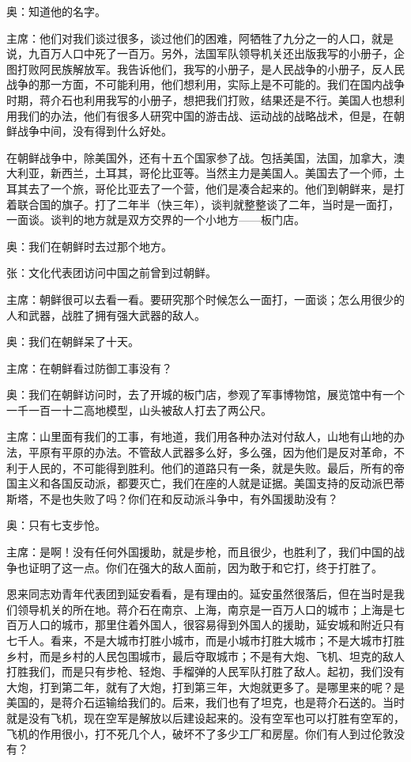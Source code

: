 奥：知道他的名字。

主席：他们对我们谈过很多，谈过他们的困难，阿牺牲了九分之一的人口，就是说，九百万人口中死了一百万。另外，法国军队领导机关还出版我写的小册子，企图打败阿民族解放军。我告诉他们，我写的小册子，是人民战争的小册子，反人民战争的那一方面，不可能利用，他们想利用，实际上是不可能的。我们在国内战争时期，蒋介石也利用我写的小册子，想把我们打败，结果还是不行。美国人也想利用我们的办法，他们有很多人研究中国的游击战、运动战的战略战术，但是，在朝鲜战争中间，没有得到什么好处。

在朝鲜战争中，除美国外，还有十五个国家参了战。包括美国，法国，加拿大，澳大利亚，新西兰，土耳其，哥伦比亚等。当然主力是美国人。美国去了一个师，土耳其去了一个旅，哥伦比亚去了一个营，他们是凑合起来的。他们到朝鲜来，是打着联合国的旗子。打了二年半（快三年），谈判就整整谈了二年，当时是一面打，一面谈。谈判的地方就是双方交界的一个小地方——板门店。

奥：我们在朝鲜时去过那个地方。

张：文化代表团访问中国之前曾到过朝鲜。

主席：朝鲜很可以去看一看。要研究那个时候怎么一面打，一面谈；怎么用很少的人和武器，战胜了拥有强大武器的敌人。

奥：我们在朝鲜呆了十天。

主席：在朝鲜看过防御工事没有？

奥：我们在朝鲜访问时，去了开城的板门店，参观了军事博物馆，展览馆中有一个一千一百一十二高地模型，山头被敌人打去了两公尺。

主席：山里面有我们的工事，有地道，我们用各种办法对付敌人，山地有山地的办法，平原有平原的办法。不管敌人武器多么好，多么强，因为他们是反对革命，不利于人民的，不可能得到胜利。他们的道路只有一条，就是失败。最后，所有的帝国主义和各国反动派，都要灭亡，我们在座的人就是证据。美国支持的反动派巴蒂斯塔，不是也失败了吗？你们在和反动派斗争中，有外国援助没有？

奥：只有七支步怆。

主席：是啊！没有任何外国援助，就是步枪，而且很少，也胜利了，我们中国的战争也证明了这一点。你们在强大的敌人面前，因为敢于和它打，终于打胜了。

恩来同志劝青年代表团到延安看看，是有理由的。延安虽然很落后，但在当时是我们领导机关的所在地。蒋介石在南京、上海，南京是一百万人口的城市；上海是七百万人口的城市，那里住着外国人，很容易得到外国人的援助，延安城和附近只有七千人。看来，不是大城市打胜小城市，而是小城市打胜大城市；不是大城市打胜乡村，而是乡村的人民包围城市，最后夺取城市；不是有大炮、飞机、坦克的敌人打胜我们，而是只有步枪、轻炮、手榴弹的人民军队打胜了敌人。起初，我们没有大炮，打到第二年，就有了大炮，打到第三年，大炮就更多了。是哪里来的呢？是美国的，是蒋介石运输给我们的。后来，我们也有了坦克，也是蒋介石送的。当时就是没有飞机，现在空军是解放以后建设起来的。没有空军也可以打胜有空军的，飞机的作用很小，打不死几个人，破坏不了多少工厂和房屋。你们有人到过伦敦没有？

